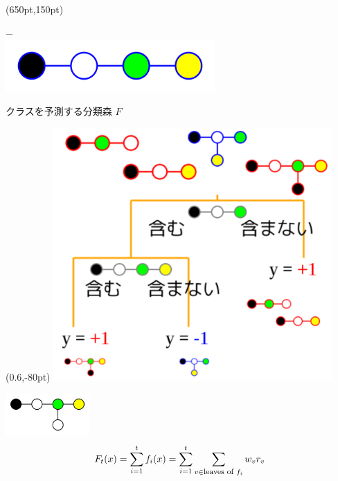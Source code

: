 \begin{tcolorbox}[title={\Large グラフの教師あり分類問題}]
	\begin{textblock*}{0.2\textwidth}(650pt,150pt)
		\begin{center}
			$\minus$ \\
			\includegraphics[width=0.6\textwidth]{img/graph/g08b.png}
		\end{center}
	\end{textblock*}

	\vspace{350px}

	クラスを予測する分類森 $F$ \\
	\begin{textblock*}{0.45\textwidth}(0.6\hsize,-80pt)
		\includegraphics[width=0.8\textwidth]{img/dt.png}
	\end{textblock*}
	\begin{minipage}[t]{0.45\hsize}
		\begin{center}
			\includegraphics[width=0.24\textwidth]{img/graph/g09.png}
			 \\
			\[
				F_t(x) = \sum_{i=1}^{t} f_i(x) = \sum_{i=1}^{t} \sum_{v \in \mbox{\footnotesize leaves of }f_i} w_v r_v
			\]
		\end{center}
	\end{minipage} \\
	\vspace{50pt}


\end{tcolorbox}
